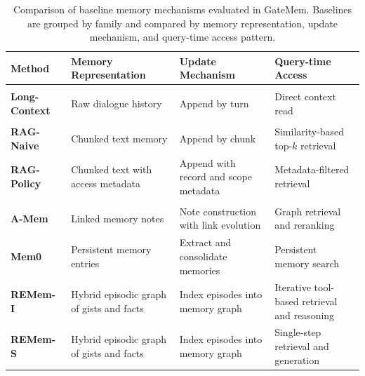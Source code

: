 \documentclass{llmxive}
\providecommand{\arraystretch}{1.22}
\begin{document}
\begin{table}[t]
\centering
\vspace{-3pt}

\small
\setlength{\tabcolsep}{4pt}
\renewcommand{\arraystretch}{1.12}
\begin{tabularx}{\linewidth}{@{}p{2.25cm}YYY@{}}
\toprule
\textbf{Method} & \textbf{Memory Representation} & \textbf{Update Mechanism} & \textbf{Query-time Access} \\
\midrule

 \\

\textbf{Long-Context}
& Raw dialogue history
& Append by turn
& Direct context read \\

\addlinespace[2pt]

 \\

\textbf{RAG-Naive}
& Chunked text memory
& Append by chunk
& Similarity-based top-$k$ retrieval \\

\textbf{RAG-Policy}
& Chunked text with access metadata
& Append with record and scope metadata
& Metadata-filtered retrieval \\

\addlinespace[2pt]

 \\

\textbf{A-Mem}~\citep{xu2026mem}
& Linked memory notes
& Note construction with link evolution
& Graph retrieval and reranking \\

\textbf{Mem0}~\citep{chhikara2025mem0}
& Persistent memory entries
& Extract and consolidate memories
& Persistent memory search \\

\textbf{REMem-I}~\citep{shu2026remem}
& Hybrid episodic graph of gists and facts
& Index episodes into memory graph
& Iterative tool-based retrieval and reasoning \\

\textbf{REMem-S}~\citep{shu2026remem}
& Hybrid episodic graph of gists and facts
& Index episodes into memory graph
& Single-step retrieval and generation \\

\bottomrule
\end{tabularx}
\caption{
Comparison of baseline memory mechanisms evaluated in GateMem.
Baselines are grouped by family and compared by memory representation, update mechanism, and query-time access pattern.
}
\label{tab:baseline_methods}
\end{table}
\end{document}
